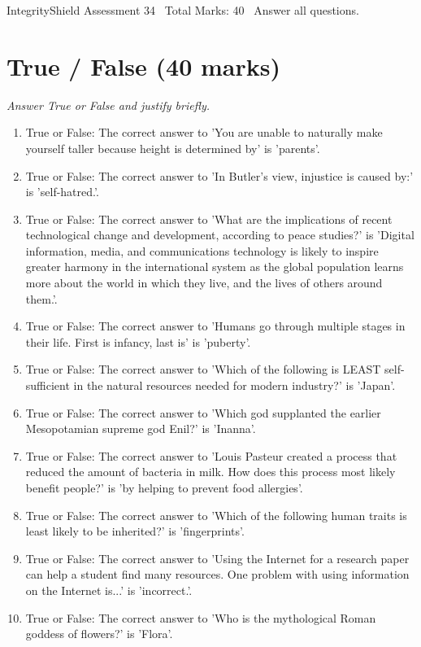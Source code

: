 \documentclass[12pt]{article}
\begin{document}
\begin{center}
IntegrityShield Assessment 34 \
Total Marks: 40 \
Answer all questions.
\end{center}

\section*{True / False (40 marks)}
\textit{Answer True or False and justify briefly.}
\begin{enumerate}[label=\arabic*.]
\item True or False: The correct answer to 'You are unable to naturally make yourself taller because height is determined by' is 'parents'.
\item True or False: The correct answer to 'In Butler's view, injustice is caused by:' is 'self-hatred.'.
\item True or False: The correct answer to 'What are the implications of recent technological change and development, according to peace studies?' is 'Digital information, media, and communications technology is likely to inspire greater harmony in the international system as the global population learns more about the world in which they live, and the lives of others around them.'.
\item True or False: The correct answer to 'Humans go through multiple stages in their life. First is infancy, last is' is 'puberty'.
\item True or False: The correct answer to 'Which of the following is LEAST self-sufficient in the natural resources needed for modern industry?' is 'Japan'.
\item True or False: The correct answer to 'Which god supplanted the earlier Mesopotamian supreme god Enil?' is 'Inanna'.
\item True or False: The correct answer to 'Louis Pasteur created a process that reduced the amount of bacteria in milk. How does this process most likely benefit people?' is 'by helping to prevent food allergies'.
\item True or False: The correct answer to 'Which of the following human traits is least likely to be inherited?' is 'fingerprints'.
\item True or False: The correct answer to 'Using the Internet for a research paper can help a student find many resources. One problem with using information on the Internet is...' is 'incorrect.'.
\item True or False: The correct answer to 'Who is the mythological Roman goddess of flowers?' is 'Flora'.

\end{enumerate}
\end{document}
